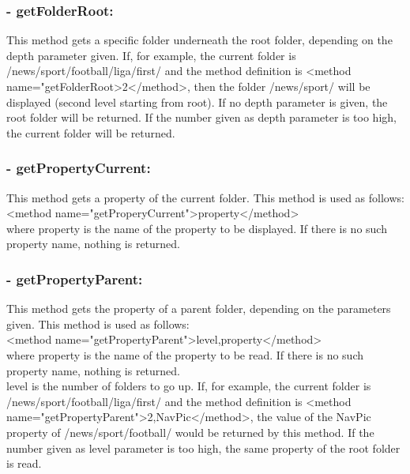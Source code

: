 \subsubsection{- getFolderRoot:} 

  This method gets a specific folder underneath the root folder, depending on the depth 
parameter given. If, for example, the current folder is {\dir /news/sport/football/liga/first/} 
and the method definition is {\tag <method name="getFolderRoot>2</method>}, then the 
folder {\dir /news/sport/} will be displayed (second level starting from root). If 
no depth parameter is given, the root folder will be returned. If the number given 
as depth parameter is too high, the current folder will be returned. \\

\subsubsection{- getPropertyCurrent:} 

  This method gets a property of the current folder. This method is used as follows:\\
{\tag <method name="getProperyCurrent">property</method>} \\
where property is the name of the property to be displayed. If there is no such property name, 
nothing is returned. \\

\subsubsection{- getPropertyParent:} 

 This method gets the property of a parent folder, depending on the parameters given. This 
method is used as follows:\\
{\tag <method name="getPropertyParent">level,property</method>} \\
where {\name property} is the name of the property to be read. If there is no such property name, 
nothing is returned. \\
{\name level} is the number of folders to go up. If, for example, the current folder is 
{\dir /news/sport/foot\-ball/li\-ga/first/} and the method definition is 
{\tag <me\-thod name="get\-Property\-Parent">2,NavPic</me\-thod>}, the value of the 
{\name NavPic} property of {\dir /news/sport/football/} would be returned by 
this method. If the number given as level parameter is too high, the same property of 
the root folder is read. \\


